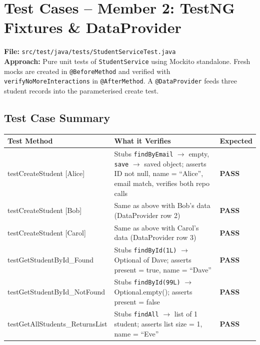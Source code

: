 \documentclass[12pt,a4paper]{article}
\begin{document}
\section{Test Cases -- Member 2: TestNG Fixtures \& DataProvider}

\textbf{File:} \texttt{src/test/java/tests/StudentServiceTest.java}\\
\textbf{Approach:} Pure unit tests of \texttt{StudentService} using Mockito standalone.
Fresh mocks are created in \texttt{@BeforeMethod} and verified with
\texttt{verifyNoMoreInteractions} in \texttt{@AfterMethod}.
A \texttt{@DataProvider} feeds three student records into the parameterised create test.

\subsection{Test Case Summary}

\begin{tabularx}{\textwidth}{>{\ttfamily\small}lX>{\bfseries}l}
\toprule
\textbf{Test Method} & \textbf{What it Verifies} & \textbf{Expected} \\
\midrule
testCreateStudent [Alice]
  & Stubs \texttt{findByEmail} $\to$ empty, \texttt{save} $\to$ saved object;
    asserts ID not null, name = ``Alice'', email match, verifies both repo calls
  & \textcolor{passgreen}{PASS} \\
\addlinespace
testCreateStudent [Bob]
  & Same as above with Bob's data (DataProvider row 2)
  & \textcolor{passgreen}{PASS} \\
\addlinespace
testCreateStudent [Carol]
  & Same as above with Carol's data (DataProvider row 3)
  & \textcolor{passgreen}{PASS} \\
\addlinespace
testGetStudentById\_Found
  & Stubs \texttt{findById(1L)} $\to$ Optional of Dave;
    asserts present = true, name = ``Dave''
  & \textcolor{passgreen}{PASS} \\
\addlinespace
testGetStudentById\_NotFound
  & Stubs \texttt{findById(99L)} $\to$ Optional.empty();
    asserts present = false
  & \textcolor{passgreen}{PASS} \\
\addlinespace
testGetAllStudents\_ReturnsList
  & Stubs \texttt{findAll} $\to$ list of 1 student;
    asserts list size = 1, name = ``Eve''
  & \textcolor{passgreen}{PASS} \\
\bottomrule
\end{tabularx}
\end{document}
